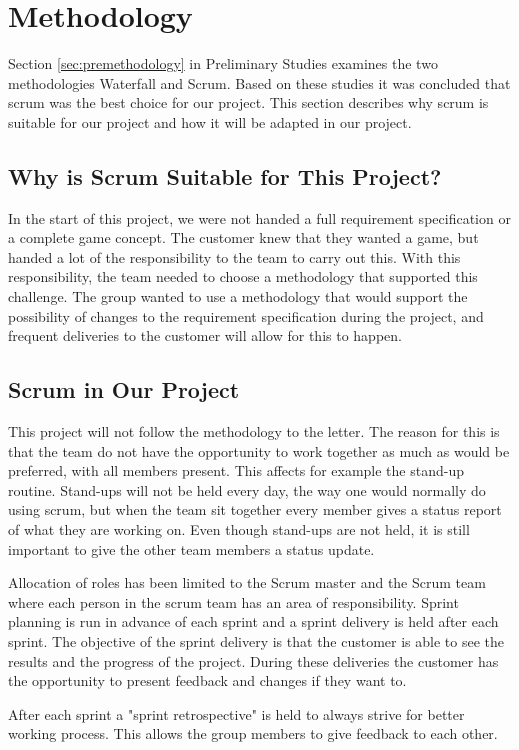 \section{Methodology}

    Section \ref{sec:premethodology} in Preliminary Studies examines the two methodologies Waterfall and Scrum. Based on 
    these studies it was concluded that scrum was the best choice for our project. This section 
    describes why scrum is suitable for our project and how it will be adapted in our project.

\subsection*{Why is Scrum Suitable for This Project?}

    In the start of this project, we were not handed a full requirement specification 
    or a complete game concept. The customer knew that they wanted a game, but handed a 
    lot of the responsibility to the team to carry out this. With this responsibility, 
    the team needed to choose a methodology that supported this challenge. The group 
    wanted to use a methodology that would support the possibility of changes to the 
    requirement specification during the project, and frequent deliveries to the customer 
    will allow for this to happen. 

\subsection*{Scrum in Our Project}

    This project will not follow the methodology to the letter. The reason for this is 
    that the team do not have the opportunity to work together as much as would be 
    preferred, with all members present. This affects for example the stand-up routine. 
    Stand-ups will not be held every day, the way one would normally do using scrum, but when the 
    team sit together every member gives a status report of what they are working on. 
    Even though stand-ups are not held, it is still important to give the other team 
    members a status update.

    Allocation of roles has been limited to the Scrum master and the Scrum team where 
    each person in the scrum team has an area of responsibility. Sprint planning is run 
    in advance of each sprint and a sprint delivery is held after each sprint. The 
    objective of the sprint delivery is that the customer is able to see the results 
    and the progress of the project. During these deliveries the customer has the 
    opportunity to present feedback and changes if they want to.

    After each sprint a "sprint retrospective" is held to always strive for better working 
    process. This allows the group members to give feedback to each other.

